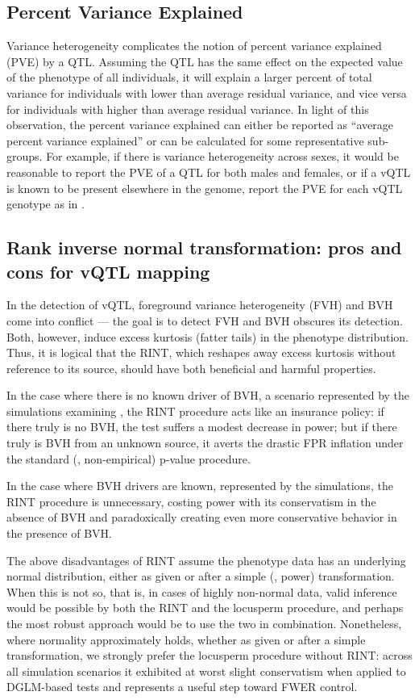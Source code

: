 \subsection{Percent Variance Explained}
Variance heterogeneity complicates the notion of percent variance explained (PVE) by a QTL.
Assuming the QTL has the same effect on the expected value of the phenotype of all individuals, it will explain a larger percent of total variance for individuals with lower than average residual variance, and vice versa for individuals with higher than average residual variance.
In light of this observation, the percent variance explained can either be reported as ``average percent variance explained'' or can be calculated for some representative sub-groups.
For example, if there is variance heterogeneity across sexes, it would be reasonable to report the PVE of a QTL for both males and females, or if a vQTL is known to be present elsewhere in the genome, report the PVE for each vQTL genotype as in \cite{Yang2012}.


\subsection{Rank inverse normal transformation: pros and cons for vQTL mapping}
In the detection of vQTL, foreground variance heterogeneity (FVH) and BVH come into conflict --- the goal is to detect FVH and BVH obscures its detection.
Both, however, induce excess kurtosis (fatter tails) in the phenotype distribution.
Thus, it is logical that the RINT, which reshapes away excess kurtosis without reference to its source, should have both beneficial and harmful properties.

In the case where there is no known driver of BVH, a scenario represented by the simulations examining \Caov, the RINT procedure acts like an insurance policy: if there truly is no BVH, the test suffers a modest decrease in power; but if there truly is BVH from an unknown source, it averts the drastic FPR inflation under the standard (\ie, non-empirical) p-value procedure.

In the case where BVH drivers are known, represented by the \DGLMv simulations, the RINT procedure is unnecessary, costing power with its conservatism in the absence of BVH and paradoxically creating even more conservative behavior in the presence of BVH.

The above disadvantages of RINT assume the phenotype data has an underlying normal distribution, either as given or after a simple (\eg, power) transformation.
When this is not so, that is, in cases of highly non-normal data, valid inference would be possible by both the RINT and the locusperm procedure, and perhaps the most robust approach would be to use the two in combination. 
Nonetheless, where normality approximately holds, whether as given or after a simple transformation, we strongly prefer the locusperm procedure without RINT: across all simulation scenarios it exhibited at worst slight conservatism when applied to DGLM-based tests and represents a useful step toward FWER control.



